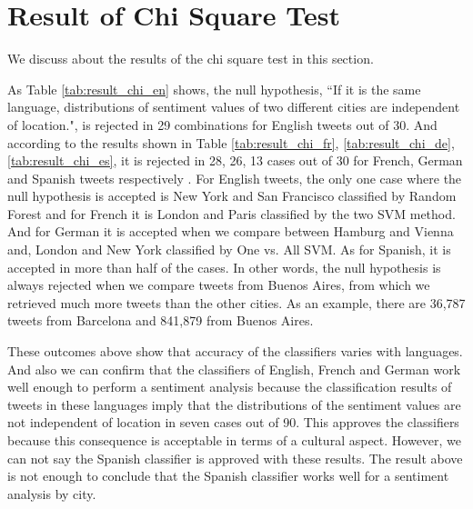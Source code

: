 
\section{Result of Chi Square Test}
We discuss about the results of the chi square test in this section.

As Table \ref{tab:result_chi_en} shows, the null hypothesis, ``If it is the same language, distributions of sentiment values of two different cities are independent of location.", is rejected in 29 combinations for English tweets out of 30.
And according to the results shown in Table \ref{tab:result_chi_fr}, \ref{tab:result_chi_de}, \ref{tab:result_chi_es}, it is rejected in 28, 26, 13 cases out of 30 for French, German and Spanish tweets respectively . 
For English tweets, the only one case where the null hypothesis is accepted is New York and San Francisco classified by Random Forest and for French it is London and Paris classified by the two SVM method.
And for German it is accepted when we compare between Hamburg and Vienna and, London and New York classified by One vs. All SVM.
As for Spanish, it is accepted in more than half of the cases.
In other words, the null hypothesis is always rejected when we compare tweets from Buenos Aires, from which we retrieved much more tweets than the other cities.
As an example, there are 36,787 tweets from Barcelona and 841,879 from Buenos Aires.

These outcomes above show that accuracy of the classifiers varies with languages. 
And also we can confirm that the classifiers of English, French and German work well enough to perform a sentiment analysis because the classification results of tweets in these languages imply that the distributions of the sentiment values are not independent of location in seven cases out of 90.
This approves the classifiers because this consequence is acceptable in terms of a cultural aspect.
However, we can not say the Spanish classifier is approved with these results.
The result above is not enough to conclude that the Spanish classifier works well for a sentiment analysis by city.

